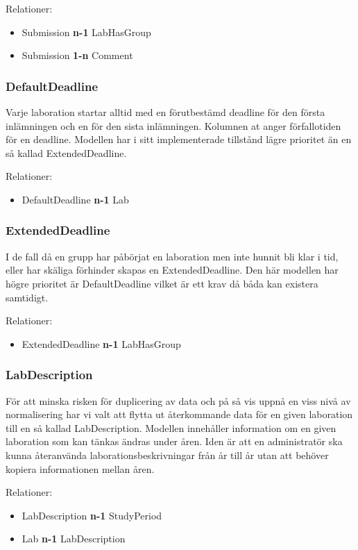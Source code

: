 Relationer: 
\begin{itemize}
  \item Submission {\bf n-1} LabHasGroup 
  \item Submission {\bf 1-n} Comment
\end{itemize}

\subsubsection{DefaultDeadline}

Varje laboration startar alltid med en förutbestämd deadline för den första inlämningen och en för den sista inlämningen. Kolumnen at anger förfallotiden för en deadline. Modellen har i sitt implementerade tillstånd lägre prioritet än en så kallad ExtendedDeadline.

Relationer: 
\begin{itemize}
  \item DefaultDeadline {\bf n-1} Lab
\end{itemize}

\subsubsection{ExtendedDeadline}

I de fall då en grupp har påbörjat en laboration men inte hunnit bli klar i tid, eller har skäliga förhinder skapas en ExtendedDeadline. Den här modellen har högre prioritet är DefaultDeadline vilket är ett krav då båda kan existera samtidigt.

Relationer: 
\begin{itemize}
  \item ExtendedDeadline {\bf n-1} LabHasGroup
\end{itemize}

\subsubsection{LabDescription}
För att minska risken för duplicering av data och på så vis uppnå en viss nivå av normalisering har vi valt att flytta ut återkommande data för en given laboration till en så kallad LabDescription. Modellen innehåller information om en given laboration som kan tänkas ändras under åren. Iden är att en administratör ska kunna återanvända laborationsbeskrivningar från år till år utan att behöver kopiera informationen mellan åren.

Relationer: 
\begin{itemize}
  \item LabDescription {\bf n-1} StudyPeriod 
  \item Lab {\bf n-1} LabDescription
\end{itemize}

